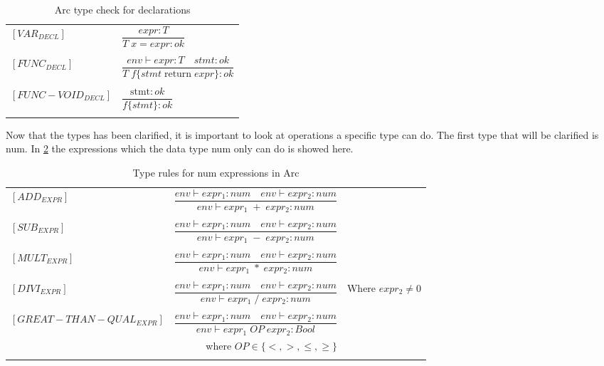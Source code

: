 \begin{table}[htb!]
    \centering
    \begin{tabular}{ll}
        $[VAR_{DECL}] $       & $\dfrac
            {expr : T}
            {T \;x = expr : ok}$
        \\
        \\
        $[FUNC_{DECL}] $      & $\dfrac
            {env \vdash expr : T \quad stmt : ok}
            {T \;f \{stmt \;\text{return} \; expr\}  : ok}$
        \\
        \\
        $[FUNC-VOID_{DECL}] $ & $\dfrac
            {\text{stmt} : ok}
            {f\{stmt\}  : ok}$
        \\
        \\
    \end{tabular}
    \caption{Arc type check for declarations}
    \label{tab:DeclTypeCheck}
\end{table}

Now that the types has been clarified, it is important to look at operations a specific type can do.
The first type that will be clarified is num.
In \ref{tab:num-rules} the expressions which the data type num only can do is showed here.

\begin{table}[htb!]
    \centering
    \begin{tabular}{lr>{\raggedright\arraybackslash}p{6cm}}
        $[ADD_{EXPR}] $                         & $\dfrac
            {env\vdash expr_1: num \quad env\vdash expr_2: num}
            {env\vdash expr_1 \;+\;expr_2: num}$
        \\
        \\
        $[SUB_{EXPR}] $                         & $\dfrac
            {env\vdash expr_1: num \quad env\vdash expr_2: num}
            {env\vdash expr_1 \;-\;expr_2: num}$
        \\
        \\
        $[MULT_{EXPR}] $                        & $\dfrac
            {env\vdash expr_1: num \quad env\vdash expr_2: num}
            {env\vdash expr_1 \;*\;expr_2: num}$
        \\
        \\
        $[DIVI_{EXPR}] $                        & $\dfrac
            {env\vdash expr_1: num \quad env\vdash expr_2: num}
        {env\vdash expr_1 \; / \; expr_2: num}$ & Where $expr_2 \neq 0$
        \\
        \\
        $[GREAT-THAN-QUAL_{EXPR}] $             & $\dfrac
            {env\vdash expr_1: num \quad env\vdash expr_2: num}
            {env\vdash expr_1 \; OP \; expr_2: Bool}$                   \\ & where $OP \in \{<, >, \leq, \geq\}$

        \\
        \\
    \end{tabular}
    \caption{Type rules for num expressions in Arc}
    \label{tab:num-rules}
\end{table}

